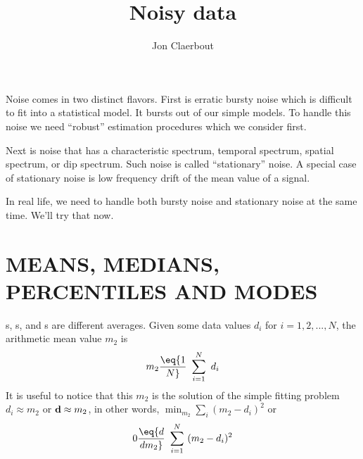 
\title{Noisy data}
\author{Jon Claerbout}
\maketitle
\label{paper:noiz}


Noise comes in two distinct flavors.
First is erratic bursty noise
which is difficult to fit into a statistical model.
It bursts out of our simple models.
To handle this noise we need ``robust'' estimation procedures
which we consider first.

\par
Next is noise that has a characteristic spectrum,
temporal spectrum, spatial spectrum, or dip spectrum.
Such noise is called ``stationary'' noise.
A special case of stationary noise is
low frequency drift of the mean value of a signal.

\par
In real life, we need to handle both bursty noise
and stationary noise at the same time.
We'll try that now.

\section{MEANS, MEDIANS, PERCENTILES AND MODES}
s, s, and s are different averages.
Given some data values $d_i$ for $i=1,2,...,N$,
the arithmetic mean value $m_2$ is
\begin{equation}
m_2 \eq {1 \over N} \ \sum_{i=1}^N \ d_i
\end{equation}
It is useful to notice that this $m_2$ is the solution
of the simple fitting problem
$ d_i \approx m_2$ or
$\bold d \approx m_2$,
in other words, $\min_{m_2} \sum_i (m_2-d_i)^2$ or
\begin{equation}
0 \eq {d \over dm_2} \ \sum_{i=1}^N \ (m_2-d_i)^2
\end{equation}

